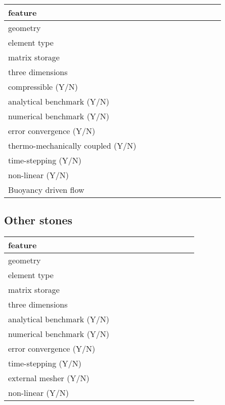 \begin{landscape}
\noindent 
{\scriptsize
\begin{tabular}{|l|p{1.5cm}|p{1.5cm}|p{1.5cm}|p{1.5cm}|p{1.5cm}|p{1.5cm}|p{1.5cm}|p{1.5cm}|p{1.5cm}|p{1.5cm}|} 
\hline
feature & &&&&&&&&& \\ 
\hline
geometry &  &&&&&&&&& \\
element type &&&&&&&&&\\ 
matrix storage & & &&&&&&&& \\
\hline
three dimensions &  &&&&&&&&& \\
compressible (Y/N) &&&&&&&&&& \\
analytical benchmark (Y/N) &&&&&&&&&& \\
numerical benchmark (Y/N) &  &&&&&&&&& \\
error convergence (Y/N) & &&&&&&&&& \\
thermo-mechanically coupled (Y/N) &&&&&&&&&& \\
time-stepping (Y/N) &&&&&&&&&& \\
non-linear (Y/N) &&&&&&&&&& \\
Buoyancy driven flow & &  &&&&&&&\\
\hline
\end{tabular}
}







\subsection{Other stones}

\noindent 
{\scriptsize
\begin{tabular}{|l|p{1.5cm}|p{1.5cm}|p{1.5cm}|p{1.5cm}|p{1.5cm}|p{1.5cm}|p{1.5cm}|p{1.5cm}|p{1.5cm}|p{1.5cm}|} 
\hline
feature & &&&&&&&&& \\ 
\hline
geometry &  &&&&&&&&& \\
element type &&&&&&&&&\\ 
matrix storage & & &&&&&&&& \\
\hline
three dimensions &  &&&&&&&&& \\
analytical benchmark (Y/N) &&&&&&&&&& \\
numerical benchmark (Y/N) &  &&&&&&&&& \\
error convergence (Y/N) & &&&&&&&&& \\
time-stepping (Y/N) &&&&&&&&&& \\
external mesher (Y/N) &&&&&&&&&& \\
non-linear (Y/N) &&&&&&&&&& \\
\hline
\end{tabular}
}













\end{landscape}
